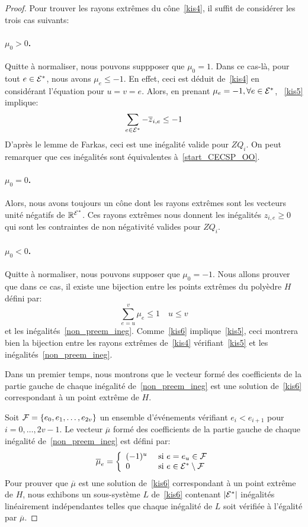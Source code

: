 \begin{proof}
Pour trouver les rayons extrêmes du cône~\eqref{kis4}, il suffit de
considérer les trois cas suivants: 
\paragraph{\boldmath $\mu_0 > 0$.} Quitte à normaliser, nous pouvons
suppposer que $\mu_0=1$. Dans ce cas-là, pour tout $e \in {\cal E}^*$, nous
avons $\mu_e \le -1$. En effet, ceci est déduit de~\eqref{kis4} en
considérant l'équation pour $u=v=e$. Alors, en prenant
$\mu_e=-1,\forall e \in {\cal E}^*$, ~\eqref{kis5} implique:
\[ \sum_{e \in {\cal E}^*} - \overline{z}_{i,e} \le -1 \] D'après le lemme
de Farkas, ceci est une inégalité valide pour $ZQ_i$. On peut
remarquer que ces inégalités sont équivalentes
à~\eqref{start_CECSP_OO}. 
\paragraph{\boldmath $\mu_0 = 0$.} Alors, nous avons toujours un cône
dont les rayons extrêmes sont les vecteurs unité négatifs de
$\mathbb{R}^{{\cal E}^*}$. Ces rayons extrêmes nous donnent les inégalités
$z_{i,e} \ge 0$ qui sont les contraintes de non négativité valides
pour $ZQ_i$.
\paragraph{\boldmath $\mu_0 < 0$.} Quitte à normaliser, nous pouvons
supposer que $\mu_0=-1$. Nous allons prouver que dans ce cas, il
existe une bijection entre les points extrêmes du polyèdre $H$ défini
par:
  \begin{equation} \sum_{e=u}^{v} \mu_e \le 1 \quad u \le
    v \label{kis6}
  \end{equation} 
et les inégalités~\eqref{non_preem_ineg}. Comme~\eqref{kis6}
implique~\eqref{kis5}, ceci montrera bien la bijection entre les
rayons extrêmes de~\eqref{kis4} vérifiant~\eqref{kis5} et les
inégalités~\eqref{non_preem_ineg}.

  Dans un premier temps, nous montrons que le vecteur formé des
  coefficients de la partie gauche de chaque inégalité
  de~\eqref{non_preem_ineg} est une solution de~\eqref{kis6}
  correspondant à un point extrême de $H$. 

  Soit ${\cal F}=\{e_0,e_1,\dots,e_{2v}\}$ un ensemble d'événements
  vérifiant $e_i<e_{i+1}$ pour $i=0,\dots,2v-1$. Le vecteur
  $\overline{\mu}$ formé des coefficients de la partie gauche de chaque
  inégalité de~\eqref{non_preem_ineg} est défini par:
  \[ \overline{\mu}_e=\left\{ 
      \begin{array}{ll}
        (-1)^u & \text{ si } e=e_u \in \cal F \\
        0 & \text{ si } e \in {\cal E}^* \setminus \cal F
      \end{array}
    \right.
  \]
  Pour prouver que $\overline{\mu}$ est une solution de~\eqref{kis6}
  correspondant à un point extrême de $H$, nous exhibons un
  sous-système $L$ de~\eqref{kis6} 
  contenant $|{\cal E}^*|$ inégalités linéairement indépendantes telles que
  chaque inégalité de $L$ soit vérifiée à l'égalité par
  $\overline{\mu}$. 


\end{proof}
